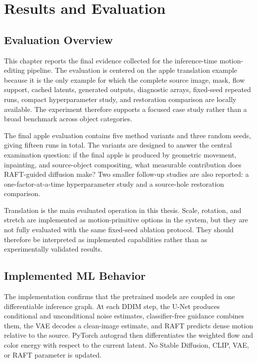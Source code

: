 \setlength{\footskip}{8mm}

\chapter{Results and Evaluation}
\label{ch:results}

\section{Evaluation Overview}

This chapter reports the final evidence collected for the inference-time motion-editing pipeline. The evaluation is centered on the apple translation example because it is the only example for which the complete source image, mask, flow support, cached latents, generated outputs, diagnostic arrays, fixed-seed repeated runs, compact hyperparameter study, and restoration comparison are locally available. The experiment therefore supports a focused case study rather than a broad benchmark across object categories.

The final apple evaluation contains five method variants and three random seeds, giving fifteen runs in total. The variants are designed to answer the central examination question: if the final apple is produced by geometric movement, inpainting, and source-object compositing, what measurable contribution does RAFT-guided diffusion make? Two smaller follow-up studies are also reported: a one-factor-at-a-time hyperparameter study and a source-hole restoration comparison.

Translation is the main evaluated operation in this thesis. Scale, rotation, and stretch are implemented as motion-primitive options in the system, but they are not fully evaluated with the same fixed-seed ablation protocol. They should therefore be interpreted as implemented capabilities rather than as experimentally validated results.

\section{Implemented ML Behavior}

The implementation confirms that the pretrained models are coupled in one differentiable inference graph. At each DDIM step, the U-Net produces conditional and unconditional noise estimates, classifier-free guidance combines them, the VAE decodes a clean-image estimate, and RAFT predicts dense motion relative to the source. PyTorch autograd then differentiates the weighted flow and color energy with respect to the current latent. No Stable Diffusion, CLIP, VAE, or RAFT parameter is updated.


